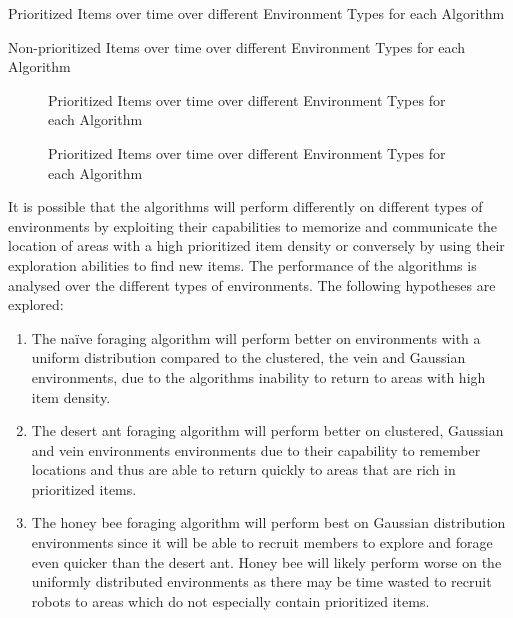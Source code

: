 \begin{table} [h]
     \caption{Prioritized Items over time over different Environment Types for each Algorithm}
     \label{environmenttypeprioritized}
	\centering
	\footnotesize
	
\end{table}

\begin{table} [h]
     \caption{Non-prioritized Items over time over different Environment Types for each Algorithm}
     \label{environmenttypenonprioritized}
	\centering
	\footnotesize
	
\end{table}

\begin{figure}[!htb]
\centering
\resizebox{0.8\textwidth}{!}{}
\caption{Prioritized Items over time over different Environment Types for each Algorithm}
\label{environmenttypes}
\end{figure}


\begin{figure}[!htb]
\centering
\resizebox{0.8\textwidth}{!}{}
\caption{Prioritized Items over time over different Environment Types for each Algorithm}
\label{environmenttypes}
\end{figure}

It is possible that the algorithms will perform differently on different types of environments by exploiting their capabilities to memorize and communicate the location of areas with a high prioritized item density or conversely by using their exploration abilities to find new items. The performance of the algorithms is analysed over the different types of environments. The following hypotheses are explored:  

\begin{enumerate}
	\item The na\"ive foraging algorithm will perform better on environments with a uniform distribution compared to the clustered, the vein and Gaussian environments, due to the algorithms inability to return to areas with high item density. 
	\item The desert ant foraging algorithm will perform better on clustered, Gaussian and vein environments environments due to their capability to remember locations and thus are able to return quickly to areas that are rich in prioritized items.
	 \item The honey bee foraging algorithm will perform best on Gaussian distribution environments since it will be able to recruit members to explore and forage even quicker than the desert ant. Honey bee will likely perform worse on the uniformly distributed environments as there may be time wasted to recruit robots to areas which do not especially contain prioritized items.
\end{enumerate}

